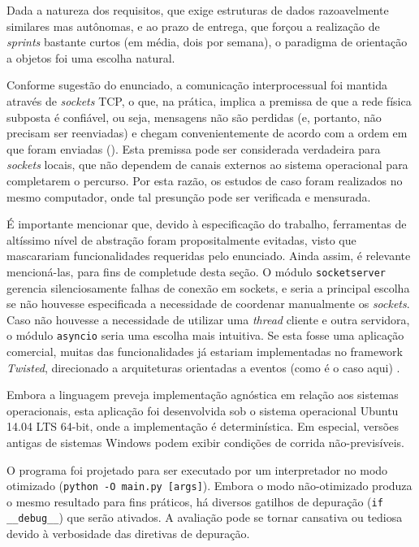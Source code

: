 \documentclass[a4paper,12pt]{article}
\begin{document}
            Dada a natureza dos requisitos, que exige estruturas de dados razoavelmente similares mas autônomas, e ao prazo de entrega, que forçou a realização de \emph{sprints} bastante curtos (em média, dois por semana), o paradigma de orientação a objetos foi uma escolha natural.

            Conforme sugestão do enunciado, a comunicação interprocessual foi mantida através de \emph{sockets} TCP, o que, na prática, implica a premissa de que a rede física subposta é confiável, ou seja, mensagens não são perdidas (e, portanto, não precisam ser reenviadas) e chegam convenientemente de acordo com a ordem em que foram enviadas (\cite{BOOK:1}).
            Esta premissa pode ser considerada verdadeira para \emph{sockets} locais, que não dependem de canais externos ao sistema operacional para completarem o percurso.
            Por esta razão, os estudos de caso foram realizados no mesmo computador, onde tal presunção pode ser verificada e mensurada.

            É importante mencionar que, devido à especificação do trabalho, ferramentas de altíssimo nível de abstração foram propositalmente evitadas, visto que mascarariam funcionalidades requeridas pelo enunciado.
            Ainda assim, é relevante mencioná-las, para fins de completude desta seção.
            O módulo \texttt{socketserver} gerencia silenciosamente falhas de conexão em sockets, e seria a principal escolha se não houvesse especificada a necessidade de coordenar manualmente os \emph{sockets}.
            Caso não houvesse a necessidade de utilizar uma \emph{thread} cliente e outra servidora, o módulo \texttt{asyncio} seria uma escolha mais intuitiva.
            Se esta fosse uma aplicação comercial, muitas das funcionalidades já estariam implementadas no framework \emph{Twisted}, direcionado a arquiteturas orientadas a eventos (como é o caso aqui) \cite{WEBSITE:11}.

            Embora a linguagem preveja implementação agnóstica em relação aos sistemas operacionais, esta aplicação foi desenvolvida sob o sistema operacional Ubuntu 14.04 LTS 64-bit, onde a implementação é determinística\cite{WEBSITE:8}.
            Em especial, versões antigas de sistemas Windows podem exibir condições de corrida não-previsíveis.

            O programa foi projetado para ser executado por um interpretador no modo otimizado (\texttt{python -O main.py [args]}).
            Embora o modo não-otimizado produza o mesmo resultado para fins práticos, há diversos gatilhos de depuração (\texttt{if \_\_debug\_\_}) que serão ativados.
            A avaliação pode se tornar cansativa ou tediosa devido à verbosidade das diretivas de depuração.
\end{document}
